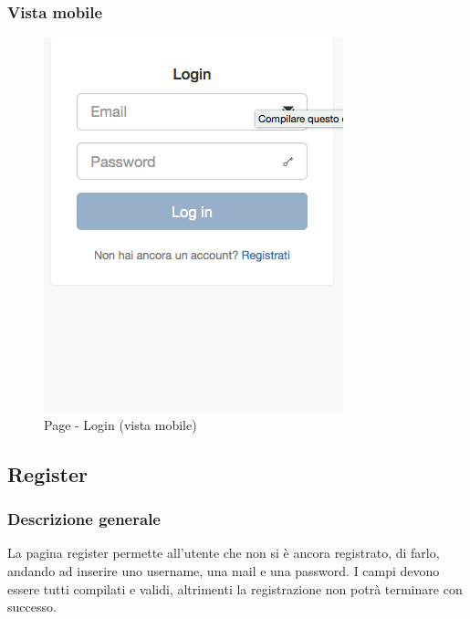 		\subsubsection{Vista mobile} %
		\begin{figure}[htbp]
			\centering
			\centerline{\includegraphics[scale=0.5]{./images/mockup/login_vm.png}}
			\caption{Page - Login (vista mobile)}
		\end{figure}

	\subsection{Register} %
	\label{sub:register}
		\subsubsection{Descrizione generale} %
		La pagina register permette all'utente che non si è ancora registrato, di farlo, andando ad inserire uno username, una mail e una password. I campi devono essere tutti compilati e validi, altrimenti la registrazione non potrà terminare con successo.

